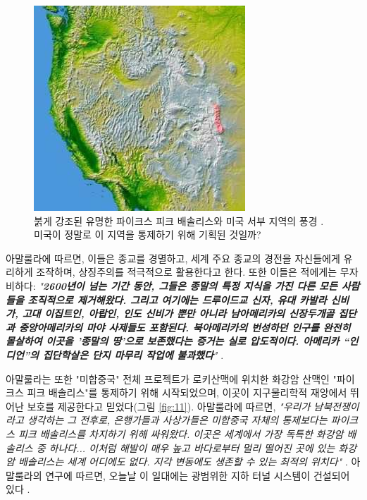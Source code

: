 \documentclass[10pt,twocolumn,letterpaper]{article}
\begin{document}
\begin{figure}[t]
\begin{center}
   \includegraphics[width=1\linewidth]{pike.jpg}
\end{center}
   \caption{붉게 강조된 유명한 파이크스 피크 배솔리스와 미국 서부 지역의 풍경 \cite{36}. 미국이 정말로 이 지역을 통제하기 위해 기획된 것일까?}
\label{fig:11}
\label{fig:onecol}
\end{figure}

아말룰라에 따르면, 이들은 종교를 경멸하고, 세계 주요 종교의 경전을 자신들에게 유리하게 조작하며, 상징주의를 적극적으로 활용한다고 한다. 또한 이들은 적에게는 무자비하다: \textit{"\textbf{2600년이 넘는 기간 동안, 그들은 종말의 특정 지식을 가진 다른 모든 사람들을 조직적으로 제거해왔다. 그리고 여기에는 드루이드교 신자, 유대 카발라 신비가, 고대 이집트인, 아랍인, 인도 신비가 뿐만 아니라 남아메리카의 신장두개골 집단과 중앙아메리카의 마야 사제들도 포함된다. 북아메리카의 번성하던 인구를 완전히 몰살하여 이곳을 '종말의 땅'으로 보존했다는 증거는 실로 압도적이다. 아메리카 “인디언”의 집단학살은 단지 마무리 작업에 불과했다}"} \cite{33,34}.

아말룰라는 또한 "미합중국" 전체 프로젝트가 로키산맥에 위치한 화강암 산맥인 "파이크스 피크 배솔리스"를 통제하기 위해 시작되었으며, 이곳이 지구물리학적 재앙에서 뛰어난 보호를 제공한다고 믿었다(그림 \ref{fig:11}). 아말룰라에 따르면, \textit{"우리가 남북전쟁이라고 생각하는 그 전후로, 은행가들과 사상가들은 미합중국 자체의 통제보다는 파이크스 피크 배솔리스를 차지하기 위해 싸워왔다. 이곳은 세계에서 가장 독특한 화강암 배솔리스 중 하나다... 이처럼 해발이 매우 높고 바다로부터 멀리 떨어진 곳에 있는 화강암 배솔리스는 세계 어디에도 없다. 지각 변동에도 생존할 수 있는 최적의 위치다"} \cite{33,34}. 아말룰라의 연구에 따르면, 오늘날 이 일대에는 광범위한 지하 터널 시스템이 건설되어 있다 \cite{36}.
\end{document}
